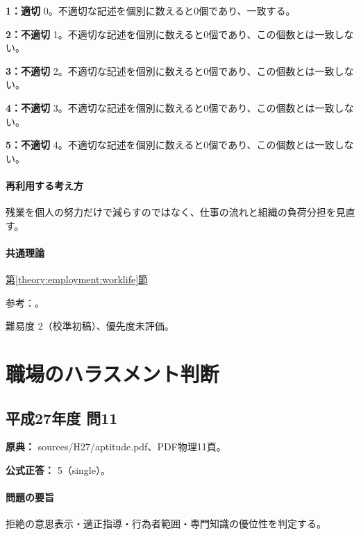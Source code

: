 \noindent\textbf{1：適切} 0。不適切な記述を個別に数えると0個であり、一致する。\par

\noindent\textbf{2：不適切} 1。不適切な記述を個別に数えると0個であり、この個数とは一致しない。\par

\noindent\textbf{3：不適切} 2。不適切な記述を個別に数えると0個であり、この個数とは一致しない。\par

\noindent\textbf{4：不適切} 3。不適切な記述を個別に数えると0個であり、この個数とは一致しない。\par

\noindent\textbf{5：不適切} 4。不適切な記述を個別に数えると0個であり、この個数とは一致しない。\par

\paragraph{再利用する考え方} 残業を個人の努力だけで減らすのではなく、仕事の流れと組織の負荷分担を見直す。

\paragraph{共通理論} \hyperref[theory:employment:worklife]{第\ref*{theory:employment:worklife}節}

\par 参考：\cite{employment_worklife2010}。

\par 難易度 2（校準初稿）、優先度未評価。

\section{職場のハラスメント判断}

\subsection{平成27年度 問11}
\label{q:h27-reg-apt-11}

\noindent\textbf{原典：} sources/H27/aptitude.pdf、PDF物理11頁。

\textbf{公式正答：} 5（single）。

\paragraph{問題の要旨} 拒絶の意思表示・適正指導・行為者範囲・専門知識の優位性を判定する。

